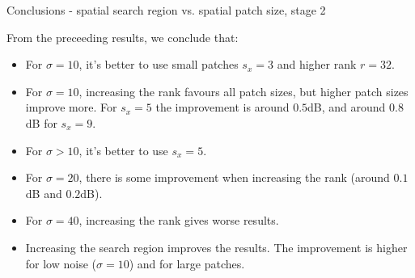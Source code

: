 \documentclass[mathserif, 8pt]{beamer}
\begin{document}
\begin{frame}{Conclusions - spatial search region vs. spatial patch size, stage 2}

	From the preceeding results, we conclude that:
	\begin{itemize}\itemsep=.2cm
		\item For $\sigma = 10$, it's better to use small patches $s_x = 3$ and higher rank $r = 32$. 
		\item For $\sigma = 10$, increasing the rank favours all patch sizes, but
			higher patch sizes improve more. For $s_x = 5$ the improvement is
			around $0.5$dB, and around $0.8$dB for $s_x = 9$.
		\item For $\sigma > 10$, it's better to use $s_x = 5$. 
		\item For $\sigma = 20$, there is some improvement when increasing the rank (around $0.1$dB and $0.2$dB). 
		\item For $\sigma = 40$, increasing the rank gives worse results. 
		\item Increasing the search region improves the results. The improvement is higher for low
			noise ($\sigma = 10$) and for large patches.
	\end{itemize}

\end{frame}
\end{document}
